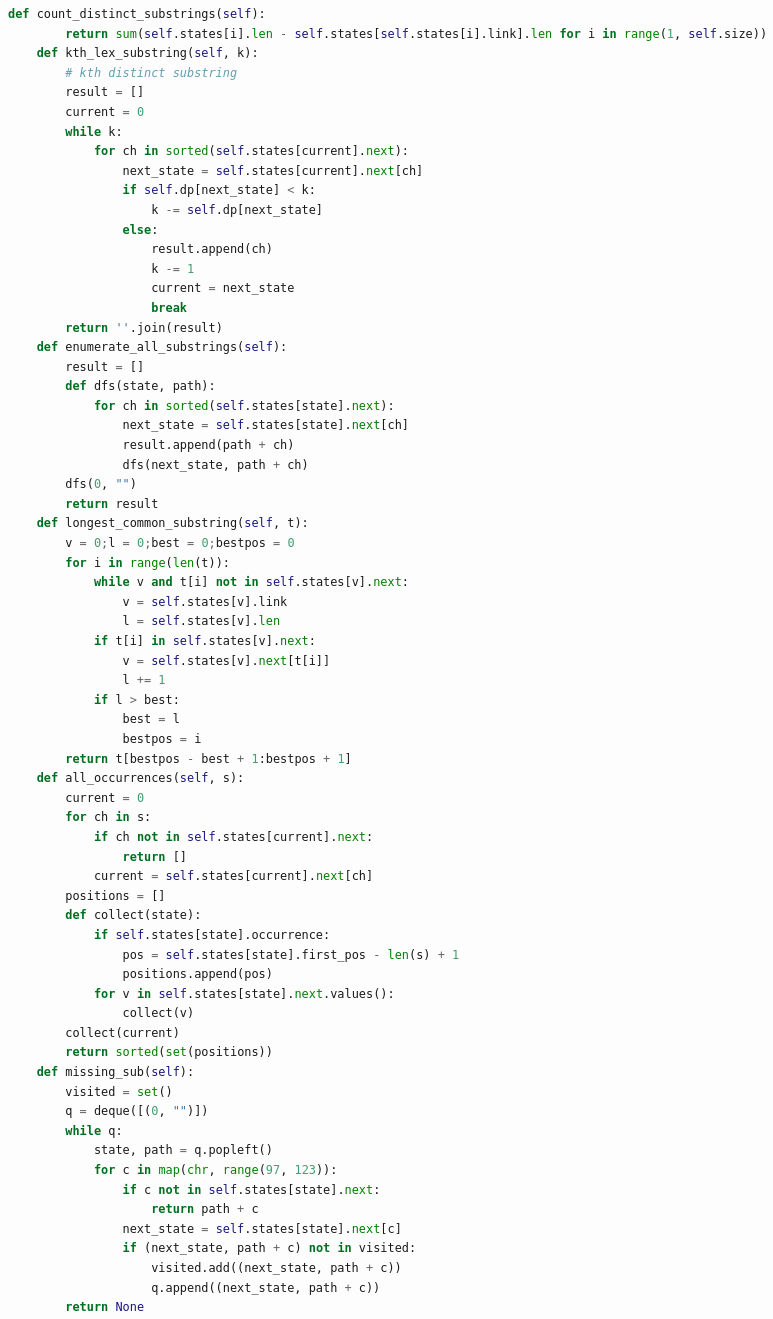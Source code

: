 \documentclass[10pt,landscape, a4paper]{article}
\begin{document}
\begin{multicols*}{3}
\begin{lstlisting}[language=Python]
    def count_distinct_substrings(self):
        return sum(self.states[i].len - self.states[self.states[i].link].len for i in range(1, self.size))
    def kth_lex_substring(self, k):
        # kth distinct substring
        result = []
        current = 0
        while k:
            for ch in sorted(self.states[current].next):
                next_state = self.states[current].next[ch]
                if self.dp[next_state] < k:
                    k -= self.dp[next_state]
                else:
                    result.append(ch)
                    k -= 1
                    current = next_state
                    break
        return ''.join(result)
    def enumerate_all_substrings(self):
        result = []
        def dfs(state, path):
            for ch in sorted(self.states[state].next):
                next_state = self.states[state].next[ch]
                result.append(path + ch)
                dfs(next_state, path + ch)
        dfs(0, "")
        return result
    def longest_common_substring(self, t):
        v = 0;l = 0;best = 0;bestpos = 0
        for i in range(len(t)):
            while v and t[i] not in self.states[v].next:
                v = self.states[v].link
                l = self.states[v].len
            if t[i] in self.states[v].next:
                v = self.states[v].next[t[i]]
                l += 1
            if l > best:
                best = l
                bestpos = i
        return t[bestpos - best + 1:bestpos + 1]
    def all_occurrences(self, s):
        current = 0
        for ch in s:
            if ch not in self.states[current].next:
                return []
            current = self.states[current].next[ch]
        positions = []
        def collect(state):
            if self.states[state].occurrence:
                pos = self.states[state].first_pos - len(s) + 1
                positions.append(pos)
            for v in self.states[state].next.values():
                collect(v)
        collect(current)
        return sorted(set(positions))
    def missing_sub(self):
        visited = set()
        q = deque([(0, "")])
        while q:
            state, path = q.popleft()
            for c in map(chr, range(97, 123)):
                if c not in self.states[state].next:
                    return path + c
                next_state = self.states[state].next[c]
                if (next_state, path + c) not in visited:
                    visited.add((next_state, path + c))
                    q.append((next_state, path + c))
        return None
\end{lstlisting}


\end{multicols*}
\end{document}

